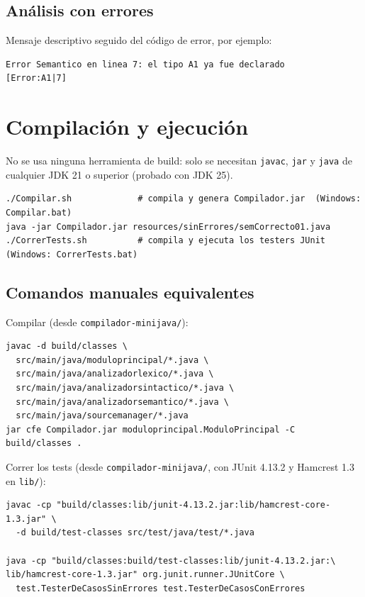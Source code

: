 \documentclass[11pt,a4paper]{article}
\begin{document}
\subsection{Análisis con errores}

Mensaje descriptivo seguido del código de error, por ejemplo:

\begin{verbatim}
Error Semantico en linea 7: el tipo A1 ya fue declarado
[Error:A1|7]
\end{verbatim}

\section{Compilación y ejecución}

No se usa ninguna herramienta de build: solo se necesitan \texttt{javac}, \texttt{jar}
y \texttt{java} de cualquier JDK 21 o superior (probado con JDK 25).

{\footnotesize
\begin{verbatim}
./Compilar.sh             # compila y genera Compilador.jar  (Windows: Compilar.bat)
java -jar Compilador.jar resources/sinErrores/semCorrecto01.java
./CorrerTests.sh          # compila y ejecuta los testers JUnit  (Windows: CorrerTests.bat)
\end{verbatim}
}

\subsection{Comandos manuales equivalentes}

Compilar (desde \texttt{compilador-minijava/}):

{\footnotesize
\begin{verbatim}
javac -d build/classes \
  src/main/java/moduloprincipal/*.java \
  src/main/java/analizadorlexico/*.java \
  src/main/java/analizadorsintactico/*.java \
  src/main/java/analizadorsemantico/*.java \
  src/main/java/sourcemanager/*.java
jar cfe Compilador.jar moduloprincipal.ModuloPrincipal -C build/classes .
\end{verbatim}
}

Correr los tests (desde \texttt{compilador-minijava/}, con JUnit 4.13.2 y Hamcrest 1.3 en
\texttt{lib/}):

{\footnotesize
\begin{verbatim}
javac -cp "build/classes:lib/junit-4.13.2.jar:lib/hamcrest-core-1.3.jar" \
  -d build/test-classes src/test/java/test/*.java

java -cp "build/classes:build/test-classes:lib/junit-4.13.2.jar:\
lib/hamcrest-core-1.3.jar" org.junit.runner.JUnitCore \
  test.TesterDeCasosSinErrores test.TesterDeCasosConErrores
\end{verbatim}
}
\end{document}
